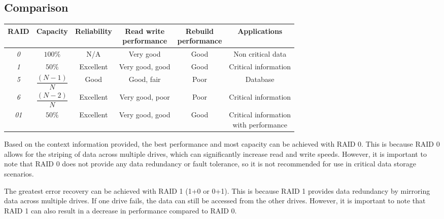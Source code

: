 \subsection{Comparison}
\begin{table}[H]
    \centering
    \begin{tabular}{|c|ccccc|}
    \hline
    \textbf{RAID} & \textbf{Capacity} & \textbf{Reliability} & \makecell{\textbf{Read write} \\\textbf{performance}} & \makecell{\textbf{Rebuild} \\\textbf{performance}} & \textbf{Applications}                 \\ \hline
    \textit{0}    & $100\%$           & N/A                  & Very good                       & Good                         & Non critical data                     \\
    \textit{1}    & $50\%$            & Excellent            & Very good, good                 & Good                         & Critical information                  \\
    \textit{5}    & $\dfrac{\left(N-1\right)}{N}$   & Good                 & Good, fair                      & Poor                         & Database                              \\
    \textit{6}    & $\dfrac{\left(N-2\right)}{N}$   & Excellent            & Very good, poor                 & Poor                         & Critical information                  \\
    \textit{01}   & $50\%$            & Excellent            & Very good, good                 & Good                         & \makecell{Critical information \\ with performance} \\ \hline
    \end{tabular}
\end{table}
Based on the context information provided, the best performance and most capacity can be achieved with RAID 0. 
This is because RAID 0 allows for the striping of data across multiple drives, which can significantly increase read and write speeds. 
However, it is important to note that RAID 0 does not provide any data redundancy or fault tolerance, so it is not recommended for use in critical data storage scenarios.

The greatest error recovery can be achieved with RAID 1 (1+0 or 0+1). This is because RAID 1 provides data redundancy by mirroring data across multiple drives. 
If one drive fails, the data can still be accessed from the other drives. 
However, it is important to note that RAID 1 can also result in a decrease in performance compared to RAID 0.

